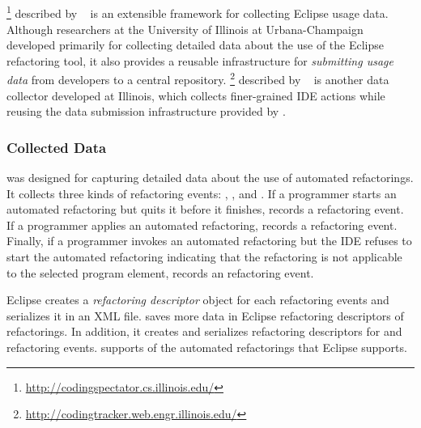 
\subsection{\CodingSpectator}
\label{CodingSpectator}

\CodingSpectator \footnote{\url{http://codingspectator.cs.illinois.edu/}} described by  ~\cite{VakilianETAL2011Richer,VakilianETAL2012UseDisuseMisuse,VakilianETAL2013Compositional}
 is
an extensible framework for collecting Eclipse usage data. Although
researchers at the University of Illinois at Urbana-Champaign
developed \CodingSpectator{} primarily for collecting detailed data
about the use of the Eclipse refactoring tool, it also provides a
reusable infrastructure for \emph{submitting usage data} from developers to
a central repository.  
\CodingTracker \footnote{\url{http://codingtracker.web.engr.illinois.edu/}} described by  ~\cite{NegaraETAL2012Dangerous,NegaraETAL2013ManualRefactorings} is another
data collector developed at Illinois, which collects finer-grained IDE
actions while reusing the data submission infrastructure provided by
\CodingSpectator.

\subsubsection{Collected Data}

\CodingSpectator{} was designed for capturing detailed data about the use of
automated refactorings. It collects three kinds of refactoring events:
\Canceled, \Performed, and \Unavailable. If a programmer starts an automated
refactoring but quits it before it finishes, \CodingSpectator{} records a
\Canceled{} refactoring event. If a programmer applies an automated refactoring,
\CodingSpectator{} records a \Performed{} refactoring event. Finally, if
a programmer invokes an automated refactoring but the IDE refuses to start the
automated refactoring indicating that the refactoring is not applicable to the
selected program element, \CodingSpectator{} records an \Unavailable{}
refactoring event.

Eclipse creates a \emph{refactoring descriptor} object for each \Performed{}
refactoring events and serializes it in an XML file. \CodingSpectator{} saves
more data in Eclipse refactoring descriptors of \Performed{} refactorings. In
addition, it creates and serializes refactoring descriptors for \Canceled{} and
\Unavailable{} refactoring events. \CodingSpectator{} supports
 of the
 automated refactorings that Eclipse
supports.

